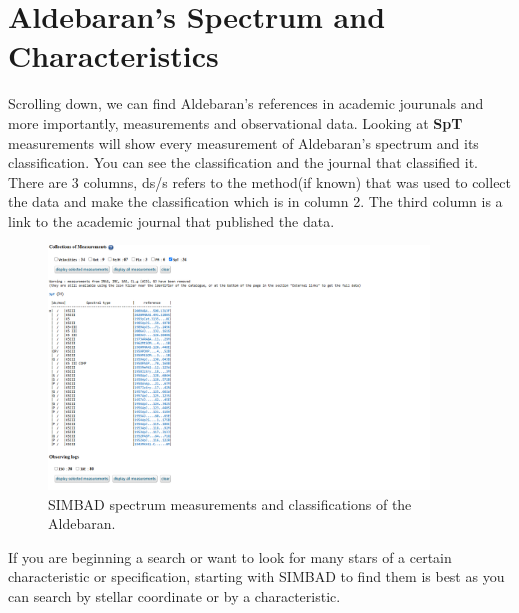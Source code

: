 \documentclass[12pt,oneside,a4paper,english]{article}
\begin{document}
\section{Aldebaran's Spectrum and Characteristics}
Scrolling down, we can find Aldebaran's references in academic jourunals and more importantly, measurements and observational data. Looking at \textbf{SpT} measurements will show every measurement of Aldebaran's spectrum and its classification. You can see the classification and the journal that classified it. There are 3 columns, ds/s refers to the method(if known) that was used to collect the data and make the classification which is in column 2. The third column is a link to the academic journal that published the data.
\begin{figure}[H]
    \centering
    \includegraphics[width=0.9\textwidth]{SINBAD3.png}
    \caption{SIMBAD spectrum measurements and classifications of the Aldebaran.\cite{simbad}}
\end{figure}
If you are beginning a search or want to look for many stars of a certain characteristic or specification, starting with SIMBAD to find them is best as you can search by stellar coordinate or by a characteristic. 
\newpage
\end{document}
